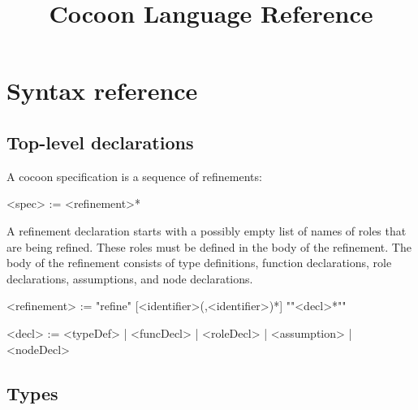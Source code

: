 \documentclass{report}
\title{Cocoon Language Reference}
\newcommand{\comment}[1]{{\textit{\textbf{#1}}}}
\begin{document}
\maketitle

\tableofcontents



\chapter{Syntax reference}\label{s:reference}

\section{Top-level declarations}

A cocoon specification is a sequence of refinements:
\begin{bnflisting}{}
<spec> := <refinement>*
\end{bnflisting}

A refinement declaration starts with a possibly empty list of names of roles that 
are being refined.  These roles must be defined in the body of the refinement.
The body of the refinement consists of type definitions, function declarations,
role declarations, assumptions, and node declarations.
\begin{bnflisting}{}
<refinement> := "refine" [<identifier>(,<identifier>)*] 
                "{"<decl>*"}"

<decl> := <typeDef>
        | <funcDecl>
        | <roleDecl>
        | <assumption>
        | <nodeDecl>
\end{bnflisting}

\section{Types}
\end{document}
